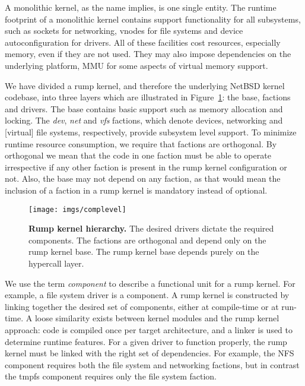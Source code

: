 A monolithic kernel, as the name implies, is one single entity.  The
runtime footprint of a monolithic kernel contains support functionality
for all subsystems, such as sockets for networking, vnodes for file
systems and device autoconfiguration for drivers.  All of these
facilities cost resources, especially memory, even if they are not
used.  They may also impose dependencies on the underlying platform,
\eg MMU for some aspects of virtual memory support.

We have divided a rump kernel, and therefore the underlying NetBSD
kernel codebase, into three layers which are illustrated in
Figure~\ref{fig:rumpcode}: the base, factions and drivers.  The base
contains basic support such as memory allocation and locking.  The
\textit{dev}, \textit{net} and \textit{vfs} factions, which denote
devices, networking and [virtual] file systems, respectively,
provide subsystem level support.  To minimize runtime resource
consumption, we require that factions are orthogonal.  By orthogonal
we mean that the code in
one faction must be able to operate irrespective if any other
faction is present in the rump kernel configuration or not.  Also, the base may
not depend on any faction, as that would mean the inclusion of a
faction in a rump kernel is mandatory instead of optional.

\begin{figure}[t]
\texttt{[image: imgs/complevel]}
\caption[Rump kernel hierarchy]{\textbf{Rump kernel hierarchy.}
The desired drivers dictate the required components.  The factions
are orthogonal and depend only on the rump kernel base.  The rump
kernel base depends purely on the hypercall layer.}
\label{fig:rumpcode}
\end{figure}

We use the term \textit{component} to describe a functional unit for a
rump kernel.  For example, a file system driver is a component.  A rump
kernel is constructed by linking together the desired set of components,
either at compile-time or at run-time.  A loose similarity exists between
kernel modules and the rump kernel approach: code is compiled once per
target architecture, and a linker is used to determine runtime features.
For a given driver to function properly, the rump kernel must be linked
with the right set of dependencies.  For example, the NFS component requires
both the file system and networking factions, but in contrast the tmpfs
component requires only the file system faction.

